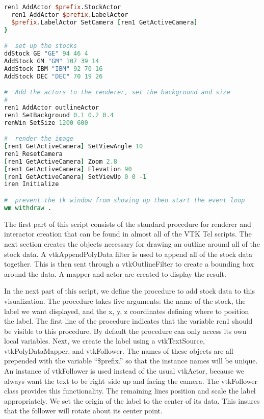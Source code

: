 \begin{lstlisting}[language=TCL, caption={Tcl script for stock case study.}, escapechar=\%]
  ren1 AddActor $prefix.StockActor
  ren1 AddActor $prefix.LabelActor
  $prefix.LabelActor SetCamera [ren1 GetActiveCamera]
}

#  set up the stocks
ddStock GE "GE" 94 46 4
AddStock GM "GM" 107 39 14
AddStock IBM "IBM" 92 70 16
AddStock DEC "DEC" 70 19 26

#  Add the actors to the renderer, set the background and size
#
ren1 AddActor outlineActor
ren1 SetBackground 0.1 0.2 0.4
renWin SetSize 1200 600

#  render the image
[ren1 GetActiveCamera] SetViewAngle 10
ren1 ResetCamera
[ren1 GetActiveCamera] Zoom 2.8
[ren1 GetActiveCamera] Elevation 90
[ren1 GetActiveCamera] SetViewUp 0 0 -1
iren Initialize

#  prevent the tk window from showing up then start the event loop
wm withdraw .
\end{lstlisting}

The first part of this script consists of the standard procedure for renderer and interactor creation that can be found in almost all of the VTK Tcl scripts. The next section creates the objects necessary for drawing an outline around all of the stock data. A vtkAppendPolyData filter is used to append all of the stock data together. This is then sent through a vtkOutlineFilter to create a bounding box around the data. A mapper and actor are created to display the result.

In the next part of this script, we define the procedure to add stock data to this visualization. The procedure takes five arguments: the name of the stock, the label we want displayed, and the x, y, z coordinates defining where to position the label. The first line of the procedure indicates that the variable ren1 should be visible to this procedure. By default the procedure can only access its own local variables. Next, we create the label using a vtkTextSource, vtkPolyDataMapper, and vtkFollower. The names of these objects are all prepended with the variable ``\$prefix.'' so that the instance names will be unique. An instance of vtkFollower is used instead of the usual vtkActor, because we always want the text to be right--side up and facing the camera. The vtkFollower class provides this functionality. The remaining lines position and scale the label appropriately. We set the origin of the label to the center of its data. This insures that the follower will rotate about its center point.

